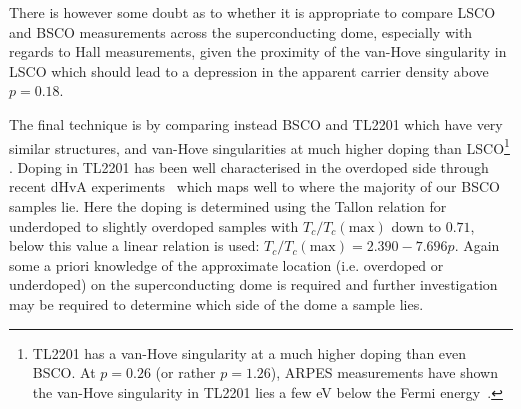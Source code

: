 There is however some doubt as to whether it is appropriate to compare \ac{LSCO} and \ac{BSCO} measurements across the superconducting dome, especially with regards to Hall measurements, given the proximity of the van-Hove singularity in \ac{LSCO} which should lead to a depression in the apparent carrier density above $p=0.18$.

The final technique is by comparing instead \ac{BSCO} and \ac{TL2201} which have very similar structures, and van-Hove singularities at much higher doping than \ac{LSCO}\footnote{\ac{TL2201} has a van-Hove singularity at a much higher doping than even \ac{BSCO}. At $p=0.26$ (or rather $p=1.26$), \ac{ARPES} measurements have shown the van-Hove singularity in \ac{TL2201} lies a few \unit{eV} below the Fermi energy~\cite{Plate2005}.} . Doping in \ac{TL2201} has been well characterised in the overdoped side through recent \ac{dHvA} experiments~\cite{Bangura2010} which maps well to where the majority of our \ac{BSCO} samples lie. Here the doping is determined using the Tallon relation for underdoped to slightly overdoped samples with $T_c/T_c(\textrm{max})$ down to $0.71$, below this value a linear relation is used: $T_c/T_c(\textrm{max}) = 2.390 - 7.696p$. Again some a priori knowledge of the approximate location (i.e. overdoped or underdoped) on the superconducting dome is required and further investigation may be required to determine which side of the dome a sample lies.

